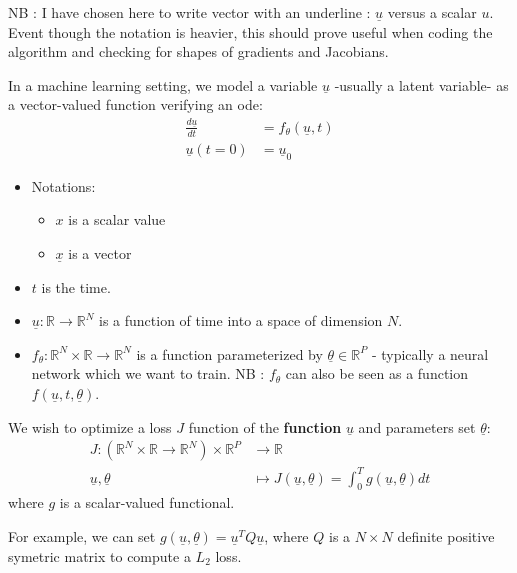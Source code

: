 NB : I have chosen here to write vector with an underline : $\underline{u}$ versus a scalar $u$. Event though the notation 
is heavier, this should prove useful when coding the algorithm and checking for shapes of gradients and Jacobians.

In a machine learning setting, we model a variable $\underline{u}$ -usually a latent variable- as a vector-valued function
     verifying an \gls{ode}:
    \begin{align}
        \label{main_ode}
        \frac{d \underline{u}}{dt} &= f_{\theta}(\underline{u},t) \\
        \underline{u}(t=0) &= \underline{u}_0
    \end{align}
    \begin{itemize}
        \item Notations:
            \begin{itemize}
                \item $x$ is a scalar value
                \item $\underline{x}$ is a vector
            \end{itemize}
        \item $t$ is the time.
        \item $\underline{u} : \mathbb{R} \rightarrow \mathbb{R}^N$ is a function of time into a space of dimension $N$.
        \item $f_{\theta} : \mathbb{R}^N \times \mathbb{R} \rightarrow \mathbb{R}^N$ is a function parameterized 
        by $\underline{\theta} \in \mathbb{R}^P$ - typically  a neural network which we want to train. NB : $f_{\theta}$ can also be seen as 
        a function $f(\underline{u}, t, \underline{\theta})$.
    \end{itemize}

    We wish to optimize a loss $J$ function of the \textbf{function} $\underline{u}$ and parameters set $\underline{\theta}$:
    \begin{align}
        \label{functionnal_loss}
        J: (\mathbb{R}^N \times \mathbb{R} \rightarrow \mathbb{R}^N) \times \mathbb{R}^P &\rightarrow \mathbb{R} \\
        \underline{u}, \underline{\theta} &\mapsto J(\underline{u}, \underline{\theta}) = \int_{0}^{T} g(\underline{u}, \underline{\theta}) dt
    \end{align}
    where $g$ is a scalar-valued functional.

    For example, we can set $g(\underline{u}, \underline{\theta}) = \underline{u}^{T} Q \underline{u}$, where $Q$ is a $N \times N$ definite positive symetric matrix to compute
     a $L_2$ loss.


